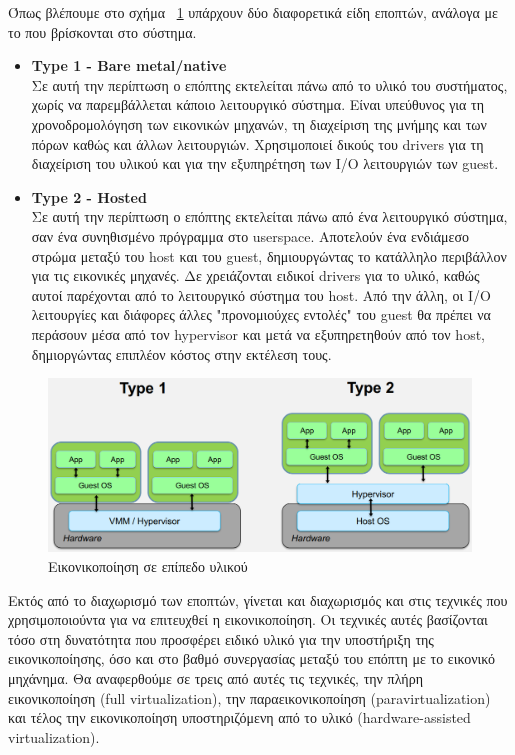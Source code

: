 Όπως βλέπουμε στο σχήμα ~\ref{fig3} υπάρχουν δύο διαφορετικά είδη εποπτών,
ανάλογα με το που βρίσκονται στο σύστημα. 
\begin{itemize}
	\item \textbf{Type 1 - Bare metal/native} \\
		Σε αυτή την περίπτωση ο επόπτης εκτελείται πάνω από το υλικό του
		συστήματος, χωρίς να παρεμβάλλεται κάποιο λειτουργικό σύστημα.
		Είναι υπεύθυνος για τη χρονοδρομολόγηση των εικονικών μηχανών,
		τη διαχείριση της μνήμης και των πόρων καθώς και άλλων
		λειτουργιών. Χρησιμοποιεί δικούς του drivers για τη διαχείριση
		του υλικού και για την εξυπηρέτηση των I/O λειτουργιών των
		guest. 
	\item \textbf{Type 2 - Hosted} \\
		Σε αυτή την περίπτωση ο επόπτης εκτελείται πάνω από ένα
		λειτουργικό σύστημα, σαν ένα συνηθισμένο πρόγραμμα στο
		userspace. Αποτελούν ένα ενδιάμεσο στρώμα μεταξύ του host και
		του guest, δημιουργώντας το κατάλληλο περιβάλλον για τις
		εικονικές μηχανές. Δε χρειάζονται ειδικοί drivers για 
		το υλικό, καθώς αυτοί παρέχονται από το λειτουργικό σύστημα του
		host. Από την άλλη, οι I/O λειτουργίες και διάφορες άλλες
		"προνομιούχες εντολές" του guest θα πρέπει να
		περάσουν μέσα από τον hypervisor και μετά να εξυπηρετηθούν από
		τον host, δημιοργώντας επιπλέον κόστος στην εκτέλεση τους. 
\end{itemize}

\begin{figure}[htp]
\centering
	\includegraphics[scale=0.3]{figures/zcBClDR.png}
\caption{Εικονικοποίηση σε επίπεδο υλικού\label{fig3}}
\end{figure}

Εκτός από το διαχωρισμό των εποπτών, γίνεται και διαχωρισμός και στις τεχνικές
που χρησιμοποιούντα για να επιτευχθεί η εικονικοποίηση. Οι τεχνικές αυτές
βασίζονται τόσο στη δυνατότητα που προσφέρει ειδικό υλικό για την υποστήριξη της
εικονικοποίησης, όσο και στο βαθμό συνεργασίας μεταξύ του επόπτη με το εικονικό
μηχάνημα. Θα αναφερθούμε σε τρεις από αυτές τις τεχνικές, την πλήρη
εικονικοποίηση (full virtualization), την παραεικονικοποίηση
(paravirtualization) και τέλος την εικονικοποίηση υποστηριζόμενη από το υλικό
(hardware-assisted virtualization). 

